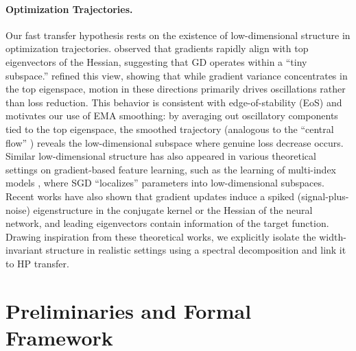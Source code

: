 \paragraph{Optimization Trajectories.}
Our fast transfer hypothesis rests on the existence of low-dimensional structure in optimization trajectories. \citet{gur2018gradient} observed that gradients rapidly align with top eigenvectors of the Hessian, suggesting that GD operates within a ``tiny subspace.'' \citet{song2024does} refined this view, showing that while gradient variance concentrates in the top eigenspace, motion in these directions primarily drives oscillations rather than loss reduction. This behavior is consistent with edge-of-stability (EoS) \citep{cohen2021gradient,damian2022self} and motivates our use of EMA smoothing: by averaging out oscillatory components tied to the top eigenspace, the smoothed trajectory (analogous to the ``central flow'' \citep{cohen2024understanding}) reveals the low-dimensional subspace where genuine loss decrease occurs. 
Similar low-dimensional structure has also appeared in various theoretical settings on gradient-based feature learning, such as the learning of multi-index models \citep{abbe2022merged,damian2022neural,mousavi2023neural,glasgow2025mean}, where SGD ``localizes'' parameters into low-dimensional subspaces. 
Recent works have also shown that gradient updates induce a spiked (signal-plus-noise) eigenstructure in the conjugate kernel \citep{moniri2023theory,wang2024nonlinear,dandi2024random} or the Hessian \citep{arous2023high,arous2025local,montanari2025phase} of the neural network, and leading eigenvectors contain information of the target function. 
Drawing inspiration from these theoretical works, we explicitly isolate the width-invariant structure in realistic settings using a spectral decomposition and link it to HP transfer.  

\section{Preliminaries and Formal Framework}\label{sec:framework}

